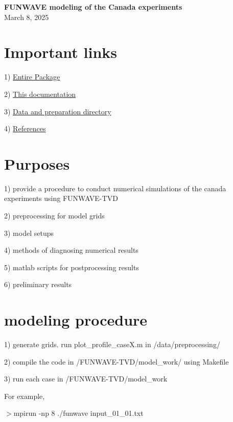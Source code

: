\documentclass[preprint,10pt]{elsarticle}
\begin{document}


\begin{center}
{\bf \Huge FUNWAVE modeling of the Canada experiments}
\\
\vspace{1cm}
March 8, 2025
\end{center}

\section*{Important links}

1) \href{https://github.com/fengyanshi/Canada_Experiment}{Entire Package}

2)  \href{https://github.com/fengyanshi/Canada_Experiment/tree/main/documentation}{This documentation}

3)  \href{https://github.com/fengyanshi/Canada_Experiment/tree/main/data}{Data and preparation directory}

4)  \href{https://github.com/fengyanshi/Canada_Experiment/tree/main/references}{References}

\section*{Purposes}

1) provide a procedure to conduct numerical simulations of the canada experiments using FUNWAVE-TVD

2) preprocessing for model grids

3) model setups

4) methods of diagnosing numerical results

5) matlab scripts for postprocessing results

6) preliminary results

  

\section*{modeling procedure}

1) generate grids. run plot\_profile\_caseX.m in /data/preprocessing/

2) compile the code in /FUNWAVE-TVD/model\_work/ using Makefile

3) run each case in /FUNWAVE-TVD/model\_work 
 
 For example, 
 
 $>$mpirun -np 8 ./funwave input\_01\_01.txt 
 
\end{document}
